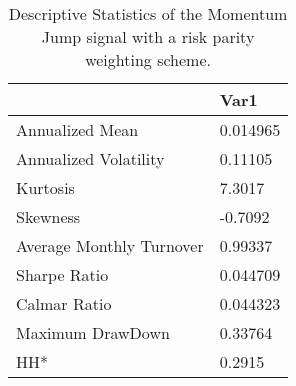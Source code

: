 \begin{table}[H]
\centering
\begin{tabular}{ll}
& Var1 \\ 
\hline 
Annualized Mean & 0.014965 \\ 
Annualized Volatility & 0.11105 \\ 
Kurtosis & 7.3017 \\ 
Skewness & -0.7092 \\ 
Average Monthly Turnover & 0.99337 \\ 
Sharpe Ratio & 0.044709 \\ 
Calmar Ratio & 0.044323 \\ 
Maximum DrawDown & 0.33764 \\ 
HH* & 0.2915 \\ 
\hline
\end{tabular}
\caption{Descriptive Statistics of the Momentum Jump signal with a risk parity weighting scheme.}
\label{MOMJUMPRP}
\end{table}
